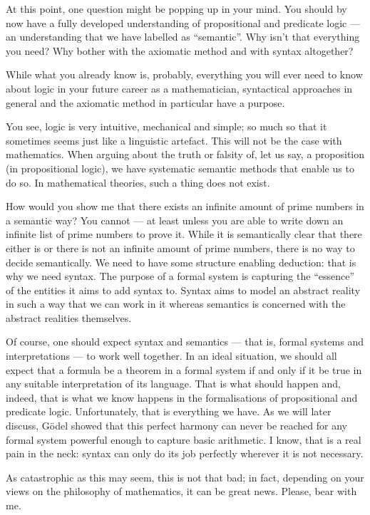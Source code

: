\begin{para}
At this point, one question might be popping up in your mind. You should by now have a fully developed understanding of propositional and predicate logic --- an understanding that we have labelled as ``semantic''.
Why isn't that everything you need? Why bother with the axiomatic method and with syntax altogether?

While what you already know is, probably, everything you will ever need to know about logic in your future career as a mathematician, syntactical approaches in general and the axiomatic method in particular have a purpose.

You see, logic is very intuitive, mechanical and simple; so much so that it sometimes seems just like a linguistic artefact.
This will not be the case with mathematics. When arguing about the truth or falsity of, let us say, a proposition (in propositional logic), we have systematic semantic methods that enable us to do so. In mathematical theories, such a thing does not exist.

How would you show me that there exists an infinite amount of prime numbers in a semantic way? You cannot --- at least unless you are able to write down an infinite list of prime numbers to prove it.
While it is semantically clear that there either is or there is not an infinite amount of prime numbers, there is no way to decide semantically.
We need to have some structure enabling deduction: that is why we need syntax.
The purpose of a formal system is capturing the ``essence'' of the entities it aims to add syntax to.
Syntax aims to model an abstract reality in such a way that we can work in it whereas semantics is concerned with the abstract realities themselves.

Of course, one should expect syntax and semantics --- that is, formal systems and interpretations --- to work well together. In an ideal situation, we should all expect that a formula be a theorem in a formal system if and only if it be true in any suitable interpretation of its language.
That is what should happen and, indeed, that is what we know happens in the formalisations of propositional and predicate logic. Unfortunately, that is everything we have.
As we will later discuss, G\"odel showed that this perfect harmony can never be reached for any formal system powerful enough to capture basic arithmetic. I know, that is a real pain in the neck: syntax can only do its job perfectly wherever it is not necessary.

As catastrophic as this may seem, this is not that bad; in fact, depending on your views on the philosophy of mathematics, it can be great news. Please, bear with me.
\label{whybother}
\end{para}

